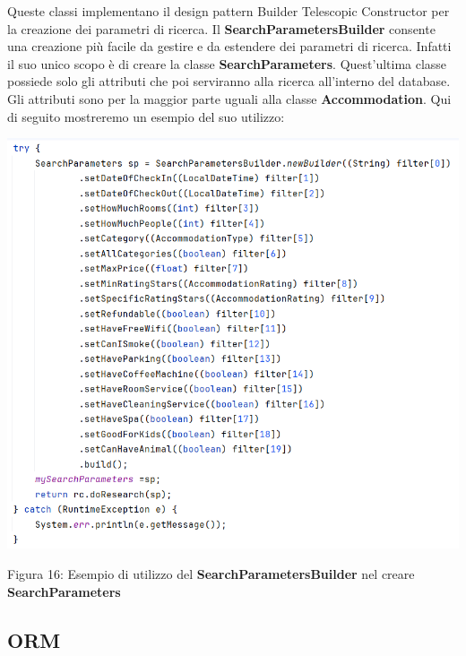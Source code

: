 \documentclass[10pt]{article}
\begin{document}
Queste classi implementano il design pattern Builder Telescopic Constructor per la creazione dei parametri di ricerca. Il \textbf{SearchParametersBuilder} consente una creazione pi\`u facile da gestire e da estendere dei parametri di ricerca. Infatti il suo unico scopo \`e di creare la classe \textbf{SearchParameters}. Quest'ultima classe possiede solo gli attributi che poi serviranno alla ricerca all'interno del database. Gli attributi sono per la maggior parte uguali alla classe \textbf{Accommodation}.
Qui di seguito mostreremo un esempio del suo utilizzo:
\begin{center}
\par\medskip
\includegraphics[scale=0.65]{Snippets/Esempio di SearchParametersBuilder.png}
\par\medskip
\par
Figura 16: Esempio di utilizzo del \textbf{SearchParametersBuilder} nel creare \textbf{SearchParameters}
\par\medskip
\end{center}
\subsection{ORM}
\end{document}
